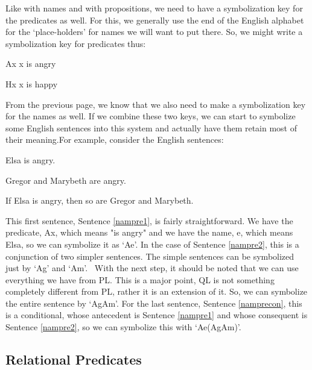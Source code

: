 Like with names and with propositions, we need to have a symbolization key for the predicates as well. For this, we generally use the end of the English alphabet for the ‘place-holders' for names we will want to put there. So, we might write a symbolization key for predicates thus:
\begin{ekey}
\item[Ax] x is angry
\item[Hx] x is happy
\end{ekey}
From the previous page, we know that we also need to make a symbolization key for the names as well. If we combine these two keys, we can start to symbolize some English sentences into this system and actually have them retain most of their meaning.For example, consider the English sentences:
\begin{earg}
\item[\ex{nampre1}] Elsa is angry.
\item[\ex{nampre2}] Gregor and Marybeth are angry.
\item[\ex{namprecon}] If Elsa is angry, then so are Gregor and Marybeth.
\end{earg}
This first sentence, Sentence \ref{nampre1}, is fairly straightforward. We have the predicate, Ax, which means "is angry" and we have the name, e, which means Elsa, so we can symbolize it as ‘Ae’. In the case of Sentence \ref{nampre2}, this is a conjunction of two simpler sentences. The simple sentences can be symbolized just by ‘Ag’ and ‘Am’.  With the next step, it should be noted that we can use everything we have from PL. This is a major point, QL is not something completely different from PL, rather it is an extension of it. So, we can symbolize the entire sentence by ‘Ag\eand Am’. For the last sentence, Sentence \ref{namprecon}, this is a conditional, whose antecedent is Sentence \ref{nampre1} and whose consequent is Sentence \ref{nampre2}, so we can symbolize this with ‘Ae\eif (Ag\eand Am)’.

\subsection{Relational Predicates}


